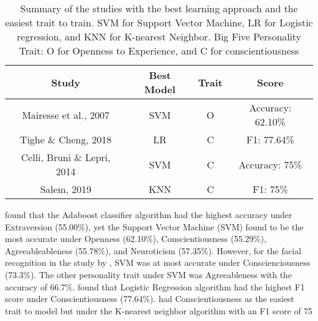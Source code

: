 \begin{table}
\begin{center}
\begin{tabular}{|c|c|c|c|}
	\hline
	\textbf{Study} & \textbf{Best Model} & \textbf{Trait} & \textbf{Score} \\
	\hline
	Mairesse et al., 2007 & SVM & O & Accuracy: 62.10\% \\
	\hline
	Tighe \& Cheng, 2018 & LR & C & F1: 77.64\% \\
	\hline
	Celli, Bruni \& Lepri, 2014 & SVM & C & Accuracy: 75\% \\
	\hline
	Salem, 2019 & KNN & C & F1: 75\% \\
	\hline
\end{tabular}
\caption{Summary of the studies with 
	the best learning approach and the easiest trait to train.
	SVM for Support Vector Machine, LR for Logistic regression, and
	KNN for K-nearest Neighbor. Big Five Personality Trait: 
	O for Openness to Experience, and C for conscientiousness}
\label{learning_approach}
\end{center}
\end{table}




\citet{mairesse_using_2007} found that the Adaboost classifier algorithm had the highest accuracy under Extraversion (55.00\%), yet the Support Vector Machine (SVM) found to be the most accurate under Openness (62.10\%), Conscientiousness (55.29\%), Agreeableableness (55.78\%), and Neuroticism (57.35\%). However, for the facial recognition in the study by \citet{celli_automatic_2014}, SVM was at most accurate under Conscienciousness (73.3\%). The other personality trait under SVM was Agreeableness with the accuracy of 66.7\%. \citet{tighe_modeling_2018} found that Logistic Regression algorithm had the highest F1 score under Conscientiousness (77.64\%). \citet{salem_personality_2019} had Conscientiousness as the easiest trait to model but under the K-nearest neighbor algorithm with an F1 score of 75%

\begin{comment}
\begin{itemize}
    \item \citet{tighe_modeling_2018}
    \item \citet{mairesse_using_2007}
    \item \citet{ilmini_persons_2016}
    \item \citet{deilami_using_2022}
    \item \citet{farnadi_computational_2016}
    \item \citet{celli_automatic_2014}
    \item \citet{sarkar_feature_2014}
    \item \citet{salem_personality_2019}
    \item \citet{farnadi_computational_2016}
\end{itemize}
\end{comment}

